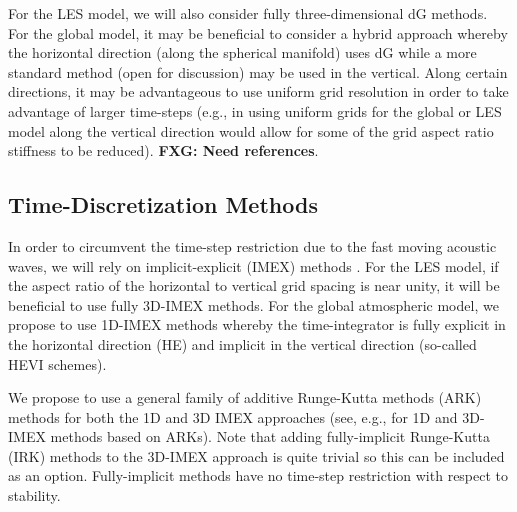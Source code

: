 \documentclass[12pt]{article}
\begin{document}
For the LES model, we will also consider fully three-dimensional dG methods. For the global model, it may be beneficial to consider a hybrid approach whereby the horizontal direction (along the spherical manifold) uses dG while a more standard method (open for discussion) may be used in the vertical.  Along certain directions, it may be advantageous to use uniform grid resolution in order to take advantage of larger time-steps (e.g., in using uniform grids for the global or LES model along the vertical direction would allow for some of the grid aspect ratio stiffness to be reduced).  \textbf{FXG: Need references}.

\subsection{Time-Discretization Methods}

In order to circumvent the time-step restriction due to the fast moving acoustic waves, we will rely on implicit-explicit (IMEX) methods . For the LES model, if the aspect ratio of the horizontal to vertical grid spacing is near unity, it will be beneficial to use fully 3D-IMEX methods.  For the global atmospheric model, we propose to use 1D-IMEX methods whereby the time-integrator is fully explicit in the horizontal direction (HE) and implicit in the vertical direction (so-called HEVI schemes).

We propose to use a general family of additive Runge-Kutta methods (ARK) methods for both the 1D and 3D IMEX approaches (see, e.g., \cite{giraldo:2013} for 1D and 3D-IMEX methods based on ARKs). Note that adding fully-implicit Runge-Kutta (IRK) methods to the 3D-IMEX approach is quite trivial so this can be included as an option. Fully-implicit methods have no time-step restriction with respect to stability.
\end{document}
